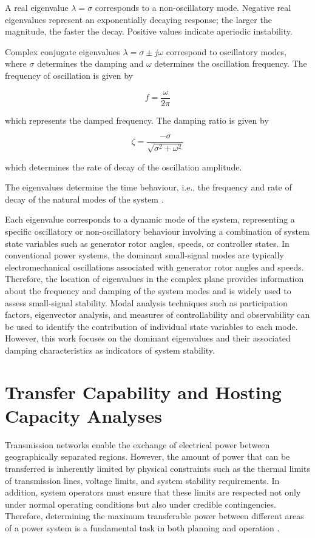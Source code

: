 A real eigenvalue $\lambda = \sigma$ corresponds to a non-oscillatory mode. Negative real eigenvalues represent an exponentially decaying response; the larger the magnitude, the faster the decay. Positive values indicate aperiodic instability.

Complex conjugate eigenvalues $\lambda = \sigma \pm j\omega$ correspond to oscillatory modes, where $\sigma$ determines the damping and $\omega$ determines the oscillation frequency. The frequency of oscillation is given by

\begin{equation}
f = \frac{\omega}{2 \pi}
\end{equation}

which represents the damped frequency. The damping ratio is given by

\begin{equation}
\zeta = \frac{-\sigma}{\sqrt{\sigma^2 + \omega^2}}
\end{equation}

which determines the rate of decay of the oscillation amplitude.

The eigenvalues determine the time behaviour, i.e., the frequency and rate of decay of the natural modes of the system \cite{Elwood1991Eigenanalysis}.

Each eigenvalue corresponds to a dynamic mode of the system, representing a specific oscillatory or non-oscillatory behaviour involving a combination of system state variables such as generator rotor angles, speeds, or controller states. In conventional power systems, the dominant small-signal modes are typically electromechanical oscillations associated with generator rotor angles and speeds. Therefore, the location of eigenvalues in the complex plane provides information about the frequency and damping of the system modes and is widely used to assess small-signal stability. 
Modal analysis techniques such as participation factors, eigenvector analysis, and measures of controllability and observability can be used to identify the contribution of individual state variables to each mode. However, this work focuses on the dominant eigenvalues and their associated damping characteristics as indicators of system stability.


\section{Transfer Capability and Hosting Capacity Analyses}

Transmission networks enable the exchange of electrical power between geographically separated regions. However, the amount of power that can be transferred is inherently limited by physical constraints such as the thermal limits of transmission lines, voltage limits, and system stability requirements. In addition, system operators must ensure that these limits are respected not only under normal operating conditions but also under credible contingencies. Therefore, determining the maximum transferable power between different areas of a power system is a fundamental task in both planning and operation \cite{wood2013power,kundur1994}.


